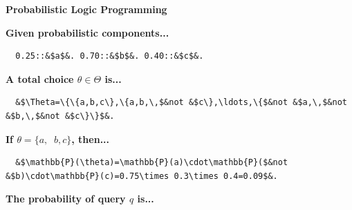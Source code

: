 \documentclass[aspectratio=169]{beamer}
\begin{document}
\begin{frame}[fragile]{\textbf{Probabilistic Logic Programming}}

{\bfseries\color{palette-orange}Given probabilistic components...}

\begin{verbatim}
  0.25::&$a$&. 0.70::&$b$&. 0.40::&$c$&.
\end{verbatim}
\pause%

\vspace{0.25cm}

{\bfseries\color{palette-orange}A total choice $\theta\in\Theta$ is...}

\vspace{0.1cm}

\begin{verbatim}
  &$\Theta=\{\{a,b,c\},\{a,b,\,$&not &$c\},\ldots,\{$&not &$a,\,$&not &$b,\,$&not &$c\}\}$&.
\end{verbatim}
\pause%

\vspace{0.25cm}

{\bfseries\color{palette-orange}If $\theta=\{a,\,$ $b,c\}$, then...}

\vspace{0.1cm}

\begin{verbatim}
  &$\mathbb{P}(\theta)=\mathbb{P}(a)\cdot\mathbb{P}($&not &$b)\cdot\mathbb{P}(c)=0.75\times 0.3\times 0.4=0.09$&.
\end{verbatim}
\pause%

\vspace{0.25cm}

{\bfseries\color{palette-orange}The probability of query $q$ is...}


\end{frame}

\end{document}

